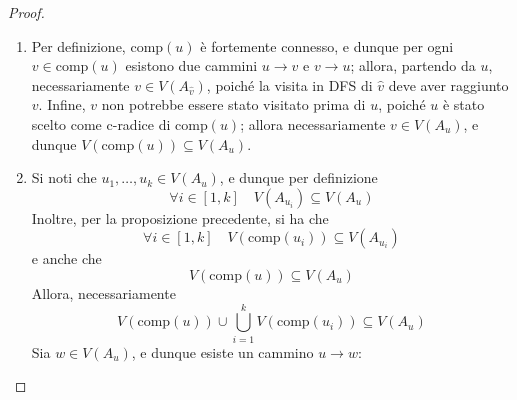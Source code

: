 \documentclass[a4paper, 12pt]{report}
\begin{document}
    \begin{proof}
        \hspace{0.7cm}
        \begin{enumerate}[label=\roman*), font=\itshape]
            \item Per definizione, $\mathrm{comp}(u)$ è fortemente connesso, e dunque per ogni $v \in \mathrm{comp}(u)$ esistono due cammini $u \rightarrow v$ e $v \rightarrow u$; allora, partendo da $u$, necessariamente $v \in V(A_{\hat v})$, poiché la visita in DFS di $\hat v$ deve aver raggiunto $v$. Infine, $v$ non potrebbe essere stato visitato prima di $u$, poiché $u$ è stato scelto come c-radice di $\mathrm{comp}(u)$; allora necessariamente $v \in V(A_u)$, e dunque $V(\mathrm{comp}(u)) \subseteq V(A_u)$.
            \item Si noti che $u_1, \ldots, u_k \in V(A_u)$, e dunque per definizione $$\forall i \in [1, k] \quad V(A_{u_i}) \subseteq V(A_u)$$
                Inoltre, per la proposizione precedente, si ha che $$\forall i \in [1, k] \quad V(\mathrm{comp}(u_i)) \subseteq V(A_{u_i})$$ e anche che $$V(\mathrm{comp}(u)) \subseteq V(A_u)$$
                Allora, necessariamente $$V(\mathrm{comp}(u)) \cup \displaystyle \bigcup_{i = 1}^k {V(\mathrm{comp}(u_i))} \subseteq V(A_u)$$
                Sia $w \in V(A_u)$, e dunque esiste un cammino $u \rightarrow w$:
                

\end{enumerate}
\end{proof}
\end{document}
